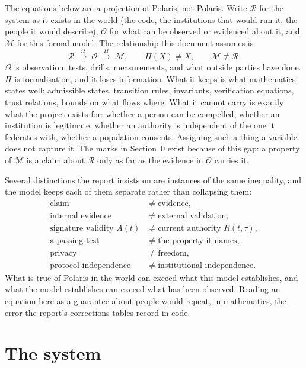 \documentclass[11pt]{article}
\theoremstyle{remark}
\begin{document}
The equations below are a projection of Polaris, not Polaris. Write $\mathcal R$ for the system as it
exists in the world (the code, the institutions that would run it, the people it would describe),
$\mathcal O$ for what can be observed or evidenced about it, and $\mathcal M$ for this formal model.
The relationship this document assumes is
\[
\mathcal R \;\xrightarrow{\;\Omega\;}\; \mathcal O \;\xrightarrow{\;\Pi\;}\; \mathcal M,
\qquad \Pi(X)\neq X,
\qquad \mathcal M\not\equiv\mathcal R .
\]
$\Omega$ is observation: tests, drills, measurements, and what outside parties have done. $\Pi$ is
formalisation, and it loses information. What it keeps is what mathematics states well: admissible
states, transition rules, invariants, verification equations, trust relations, bounds on what flows
where. What it cannot carry is exactly what the project exists for: whether a person can be
compelled, whether an institution is legitimate, whether an authority is independent of the one it
federates with, whether a population consents. Assigning such a thing a variable does not capture
it. The marks in Section~0 exist because of this gap: a property of $\mathcal M$ is a claim about
$\mathcal R$ only as far as the evidence in $\mathcal O$ carries it.

Several distinctions the report insists on are instances of the same inequality, and the model keeps
each of them separate rather than collapsing them:
\begin{align*}
\text{claim}&\neq\text{evidence},\\
\text{internal evidence}&\neq\text{external validation},\\
\text{signature validity } A(t)&\neq\text{current authority } R(t,\tau),\\
\text{a passing test}&\neq\text{the property it names},\\
\text{privacy}&\neq\text{freedom},\\
\text{protocol independence}&\neq\text{institutional independence}.
\end{align*}
What is true of Polaris in the world can exceed what this model establishes, and what the model
establishes can exceed what has been observed. Reading an equation here as a guarantee about people
would repeat, in mathematics, the error the report's corrections tables record in code.

\section{The system}
\end{document}
